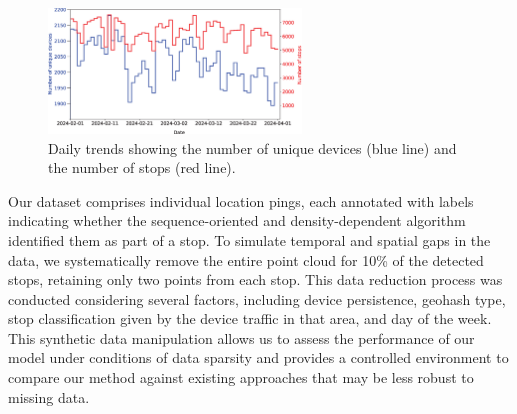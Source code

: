\documentclass{article}
\begin{document}
\begin{figure}[b!]
    \includegraphics[width=0.6\textwidth]{./Images/figure_trends.eps}
	\centering
	\caption{Daily trends showing the number of unique devices (blue line) and the number of stops (red line). %
 }
	\label{fig:fig_trend}
\end{figure}

Our dataset comprises individual location pings, each annotated with labels indicating whether the sequence-oriented and density-dependent algorithm identified them as part of a stop. To simulate temporal and spatial gaps in the data, we systematically remove the entire point cloud for 10\% of the detected stops, retaining only two points from each stop. This data reduction process was conducted considering several factors, including device persistence, geohash type, stop classification given by the device traffic in that area, and day of the week.
This synthetic data manipulation allows us to assess the performance of our model under conditions of data sparsity and provides a controlled environment to compare our method against existing approaches that may be less robust to missing data.
\end{document}
